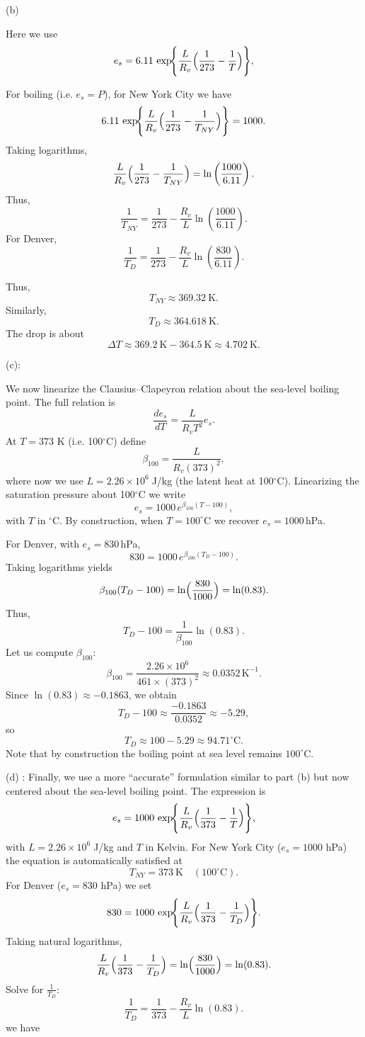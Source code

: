 \documentclass[letterpaper, 11pt]{article}
\newcommand{\1}{\mathds{1}}	%
\theoremstyle{definition}
\begin{document}
(b) 

Here we use
\[
e_s = 6.11\,\exp\!\Biggl\{\frac{L}{R_v}\Bigl(\frac{1}{273}-\frac{1}{T}\Bigr)\Biggr\},
\]

For boiling (i.e. $e_s=P$), for New York City we have
\[
6.11\,\exp\!\Biggl\{\frac{L}{R_v}\Bigl(\frac{1}{273}-\frac{1}{T_{NY}}\Bigr)\Biggr\}=1000.
\]
Taking logarithms,
\[
\frac{L}{R_v}\Bigl(\frac{1}{273}-\frac{1}{T_{NY}}\Bigr)
=\ln\left(\frac{1000}{6.11}\right).
\]
Thus,
\[
\frac{1}{T_{NY}}=\frac{1}{273}-\frac{R_v}{L}\ln\left(\frac{1000}{6.11}\right).
\]
For Denver,
\[
\frac{1}{T_{D}}=\frac{1}{273}-\frac{R_v}{L}\ln\left(\frac{830}{6.11}\right).
\]

Thus,
\[
T_{NY}\approx 369.32\ \text{K}.
\]
Similarly,
\[
T_{D}\approx 364.618\ \text{K}.
\]
The drop is about
\[
\Delta T\approx 369.2\ \text{K}-364.5\ \text{K}\approx 4.702\ \text{K}.
\]

(c):

We now linearize the Clausius--Clapeyron relation about the sea-level boiling point. The full relation is
\[
\frac{d e_s}{dT}=\frac{L}{R_vT^2}e_s.
\]
At $T=373$ K (i.e. 100$^\circ$C) define
\[
\beta_{100}=\frac{L}{R_v(373)^2},
\]
where now we use $L=2.26\times 10^6\;$J/kg (the latent heat at 100$^\circ$C). Linearizing the saturation pressure about 100$^\circ$C we write
\[
e_s=1000\,e^{\beta_{100}(T-100)},
\]
with $T$ in $^\circ$C. By construction, when $T=100^\circ$C we recover $e_s=1000\,$hPa.

For Denver, with $e_s=830\,$hPa,
\[
830=1000\,e^{\beta_{100}(T_D-100)}.
\]
Taking logarithms yields
\[
\beta_{100}(T_D-100)=\ln\Bigl(\frac{830}{1000}\Bigr)=\ln(0.83).
\]
Thus,
\[
T_D-100=\frac{1}{\beta_{100}}\ln(0.83).
\]
Let us compute $\beta_{100}$:
\[
\beta_{100}=\frac{2.26\times10^6}{461\times(373)^2}\approx 0.0352\,\text{K}^{-1}.
\]
Since $\ln(0.83)\approx-0.1863$, we obtain
\[
T_D-100\approx \frac{-0.1863}{0.0352}\approx -5.29,
\]
so
\[
T_D\approx 100-5.29\approx 94.71^\circ\text{C}.
\]
Note that by construction the boiling point at sea level remains $100^\circ$C.

(d) :
Finally, we use a more “accurate” formulation similar to part (b) but now centered about the sea-level boiling point. The expression is
\[
e_s = 1000\,\exp\!\Biggl\{\frac{L}{R_v}\Bigl(\frac{1}{373}-\frac{1}{T}\Bigr)\Biggr\},
\]
with $L=2.26\times10^6\;$J/kg and $T$ in Kelvin. For New York City ($e_s=1000$ hPa) the equation is automatically satisfied at
\[
T_{NY}=373\ \text{K}\quad (100^\circ\text{C}).
\]
For Denver ($e_s=830$ hPa) we set
\[
830=1000\,\exp\!\Biggl\{\frac{L}{R_v}\Bigl(\frac{1}{373}-\frac{1}{T_D}\Bigr)\Biggr\}.
\]
Taking natural logarithms,
\[
\frac{L}{R_v}\Bigl(\frac{1}{373}-\frac{1}{T_D}\Bigr)
=\ln\Bigl(\frac{830}{1000}\Bigr)=\ln(0.83).
\]
Solve for $\frac{1}{T_D}$:
\[
\frac{1}{T_D}=\frac{1}{373}-\frac{R_v}{L}\ln(0.83).
\]
we have
\end{document}
